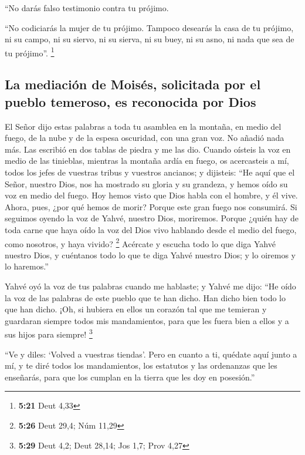  ``No darás falso testimonio contra tu prójimo.

 ``No codiciarás la mujer de tu prójimo. Tampoco desearás
la casa de tu prójimo, ni su campo, ni su siervo, ni su sierva, ni su
buey, ni su asno, ni nada que sea de tu prójimo''. \footnote{\textbf{5:21}
  Deut 4,33}

\hypertarget{la-mediaciuxf3n-de-moisuxe9s-solicitada-por-el-pueblo-temeroso-es-reconocida-por-dios}{%
\subsection{La mediación de Moisés, solicitada por el pueblo temeroso,
es reconocida por
Dios}\label{la-mediaciuxf3n-de-moisuxe9s-solicitada-por-el-pueblo-temeroso-es-reconocida-por-dios}}

 El Señor dijo estas palabras a toda tu asamblea en la
montaña, en medio del fuego, de la nube y de la espesa oscuridad, con
una gran voz. No añadió nada más. Las escribió en dos tablas de piedra y
me las dio.  Cuando oísteis la voz en medio de las
tinieblas, mientras la montaña ardía en fuego, os acercasteis a mí,
todos los jefes de vuestras tribus y vuestros ancianos; 
y dijisteis: ``He aquí que el Señor, nuestro Dios, nos ha mostrado su
gloria y su grandeza, y hemos oído su voz en medio del fuego. Hoy hemos
visto que Dios habla con el hombre, y él vive.  Ahora,
pues, ¿por qué hemos de morir? Porque este gran fuego nos consumirá. Si
seguimos oyendo la voz de Yahvé, nuestro Dios, moriremos.
 Porque ¿quién hay de toda carne que haya oído la voz del
Dios vivo hablando desde el medio del fuego, como nosotros, y haya
vivido? \footnote{\textbf{5:26} Deut 29,4; Núm 11,29} 
Acércate y escucha todo lo que diga Yahvé nuestro Dios, y cuéntanos todo
lo que te diga Yahvé nuestro Dios; y lo oiremos y lo haremos.''

 Yahvé oyó la voz de tus palabras cuando me hablaste; y
Yahvé me dijo: ``He oído la voz de las palabras de este pueblo que te
han dicho. Han dicho bien todo lo que han dicho.  ¡Oh, si
hubiera en ellos un corazón tal que me temieran y guardaran siempre
todos mis mandamientos, para que les fuera bien a ellos y a sus hijos
para siempre! \footnote{\textbf{5:29} Deut 4,2; Deut 28,14; Jos 1,7;
  Prov 4,27}

 ``Ve y diles: `Volved a vuestras tiendas'.
 Pero en cuanto a ti, quédate aquí junto a mí, y te diré
todos los mandamientos, los estatutos y las ordenanzas que les
enseñarás, para que los cumplan en la tierra que les doy en posesión.''

